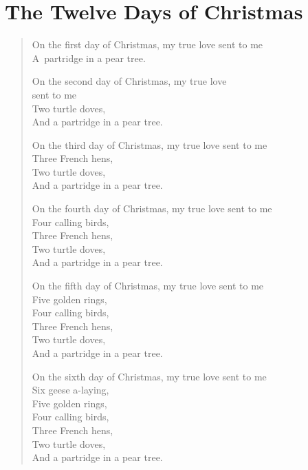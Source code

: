 \medskip

\section{The Twelve Days of Christmas} 

\begin{verse}
On the first day of Christmas, my true love sent to me \\
A~partridge in a pear tree.

\smallskip

On the second day of Christmas, my true love \\ \hspace*{\fill} sent to me \\
Two turtle doves, \\
And a partridge in a pear tree. 

\smallskip

On the third day of Christmas, my true love sent to me \\
Three French hens, \\
Two turtle doves, \\
And a partridge in a pear tree. 

\smallskip

On the fourth day of Christmas, my true love sent to me \\
Four calling birds, \\
Three French hens, \\
Two turtle doves, \\
And a partridge in a pear tree.

\smallskip

On the fifth day of Christmas, my true love sent to me \\
Five golden rings, \\
Four calling birds, \\
Three French hens, \\
Two turtle doves, \\
And a partridge in a pear tree. 

\smallskip

On the sixth day of Christmas, my true love sent to me \\
Six geese a-laying, \\
Five golden rings, \\
Four calling birds, \\
Three French hens, \\
Two turtle doves, \\
And a partridge in a pear tree.


\end{verse}
